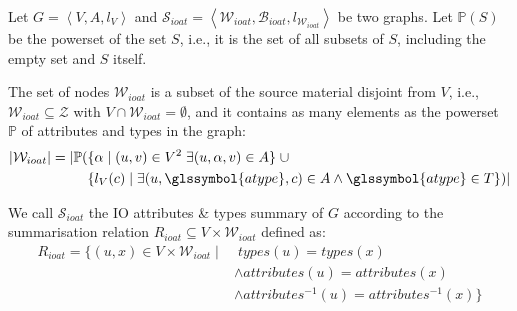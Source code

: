 \begin{definition}
	Let $G=\left\langle V, A, l_V \right\rangle$ and $\mathcal{S}_{ioat} = \left\langle \mathcal{W}_{ioat}, \mathcal{B}_{ioat}, l_{\mathcal{W}_{ioat}} \right\rangle$ be two graphs. Let $\mathbb{P}(S)$ be the powerset of the set $S$, i.e., it is the set of all subsets of $S$, including the empty set and $S$ itself.

	The set of nodes $\mathcal{W}_{ioat}$ is a subset of the source material disjoint from $V$, i.e., $\mathcal{W}_{ioat} \subseteq \mathcal{Z}$ with $V \cap \mathcal{W}_{ioat} = \emptyset$, and it contains as many elements as the powerset $\mathbb{P}$ of attributes and types in the graph:
	$$
	\begin{aligned}
	\lvert \mathcal{W}_{ioat} \rvert = \lvert \mathbb{P} ( & \{ \alpha \mid (u, v) \in V^2\; \exists (u, \alpha, v) \in A \} \;\cup \\
	& \{ l_V(c) \mid \exists (u, \glssymbol{atype}, c) \in A \wedge \glssymbol{atype} \in T \} ) \rvert
	\end{aligned}
	$$

	We call $\mathcal{S}_{ioat}$ the IO attributes \& types summary of $G$ according to the summarisation relation $R_{ioat} \subseteq V \times \mathcal{W}_{ioat}$ defined as:
	$$
	\begin{aligned}
	R_{ioat} = \{ (u, x) \in V \times \mathcal{W}_{ioat} \mid &\; types(u) = types(x) \\
	& \wedge attributes(u) = attributes(x) \\
	& \wedge attributes^{-1}(u) = attributes^{-1}(x) \}
	\end{aligned}
	$$
	\label{def:ioat}
\end{definition}
\vspace{.5cm}

